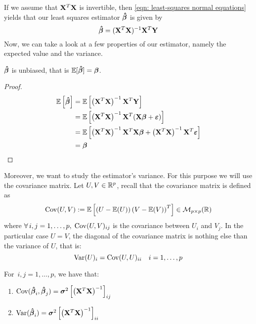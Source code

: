 If we assume that \( \mathbf{X}^T \mathbf{X} \) is invertible, then \eqref{eqn: least-squares normal equations} yields that our least squares estimator \( \boldsymbol{\hat{\beta}} \) is given by
\begin{equation}
    \label{eqn: least squares estimator}
    \boldsymbol{\hat{\beta}} = (\mathbf{X}^T \mathbf{X})^{-1} \mathbf{X}^T \mathbf{Y}
\end{equation}
Now, we can take a look at a few properties of our estimator, namely the expected value and the variance.
\begin{proposition}
    \(\boldsymbol{\hat{\beta}}\) is unbiased, that is $\mathbb{E} [\boldsymbol{\hat{\beta}}] = \boldsymbol{\beta}$.
\end{proposition}
\begin{proof}
    \begin{align*}
        \mathbb{E} \left[ \boldsymbol{\hat{\beta}} \right]
         & = \mathbb{E} \left[ \left(\mathbf{X}^{T} \mathbf{X} \right)^{-1} \mathbf{X}^{T} \mathbf{Y} \right]                                                \\
         & = \mathbb{E} \left[ \left(\mathbf{X}^{T} \mathbf{X} \right)^{-1} \mathbf{X}^{T}(\mathbf{X} \boldsymbol{\beta} + \boldsymbol{\varepsilon})\right]                                    \\
         & = \mathbb{E} \left[ \left(\mathbf{X}^{T} \mathbf{X} \right)^{-1} \mathbf{X}^{T} \mathbf{X} \boldsymbol{\beta} + \left(\mathbf{X}^{T} \mathbf{X}\right)^{-1} \mathbf{X}^{T} \boldsymbol{\varepsilon} \right] \\
         & = \boldsymbol{\beta}
    \end{align*}

\end{proof}
Moreover, we want to study the estimator's variance. For this purpose we will use the covariance matrix. Let \(U, V \in \mathbb{R}^p\), recall that the covariance matrix is defined as
\[
    \operatorname{Cov} (U, V) := \mathbb{E} \left[ \left( U - \mathbb{E} (U) \right) \left( V - \mathbb{E} (V) \right)^T \right] \in \mathcal{M}_{p \times p}(\mathbb{R})
\]
where \(\forall \, i, j = 1, \ldots, p, \; \operatorname{Cov} (U, V)_{ij}\) is the covariance between \( U_i \) and \( V_j\). In the particular case \( U = V \), the diagonal of the covariance matrix is nothing else than the variance of \( U \), that is:
\[
    \operatorname{Var} (U)_i = \operatorname{Cov} (U, U)_{ii} \quad i = 1, \ldots, p
\]
\begin{proposition}
    For \( \, i, j = 1, \ldots, p\), we have that:
    \begin{enumerate}[label=(\roman*)]
        \item \(\operatorname{Cov} (\boldsymbol{\hat{\beta}}_i, \boldsymbol{\hat{\beta}}_j) = \boldsymbol{\sigma}^{2} \left[ \left( \mathbf{X}^T \mathbf{X} \right)^{-1} \right]_{ij}\)
        \item \(\operatorname{Var} (\boldsymbol{\hat{\beta}}_i) = \boldsymbol{\sigma}^{2} \left[ \left( \mathbf{X}^T \mathbf{X} \right)^{-1} \right]_{ii}\)
    \end{enumerate}
\end{proposition}
